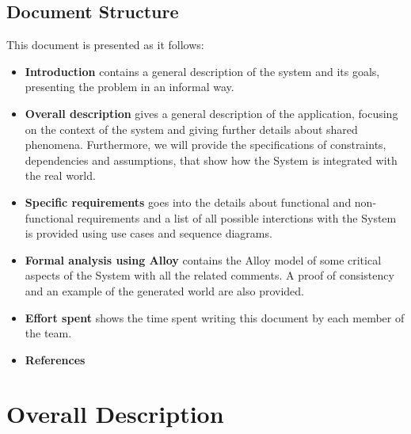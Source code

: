\documentclass{report}
\begin{document}
\section{Document Structure}
This document is presented as it follows:
\begin{itemize}
	\item {\textbf{Introduction}} contains a general description of the system and its goals, presenting the problem in an informal way.
	\item{\textbf{Overall description}} gives a general description of the application, focusing on the context of the system and giving further details about shared phenomena. Furthermore, we will provide the specifications of constraints, dependencies and assumptions, that show how the System is integrated with the real world.
	\item{\textbf{Specific requirements}} goes into the details about functional and non-functional requirements and a list of all possible interctions with the System is provided using use cases and sequence diagrams.
	\item {\textbf{Formal analysis using Alloy}} contains the Alloy model of some critical aspects of the System with all the related comments. A proof of consistency and an example of the generated world are also provided.
	\item {\textbf{Effort spent}} shows the time spent writing this document by each member of the team.
	\item {\textbf{References}}
\end{itemize}

\chapter{Overall Description}
\end{document}
